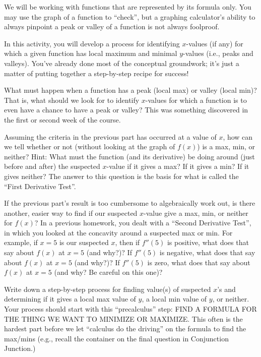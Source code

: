 \documentclass{ximera}
\begin{document}
We will be working with functions that are represented by its formula only.  You may use the graph of a function to ``check'', but a graphing calculator's ability to always pinpoint a peak or valley of a function is not always foolproof.

In this activity, you will develop a process for identifying $x$-values (if any) for which a given function has local maximum and minimal $y$-values (i.e., peaks and valleys).  You've already done most of the conceptual groundwork; it's just a matter of putting together a step-by-step recipe for success!

\begin{exploration} 
What must happen when a function  has a peak (local max) or valley (local min)?  That is, what should we look for to identify $x$-values for which a function is to even have a chance to have a peak or valley?  This was something discovered in the first or second week of the course.
\end{exploration}
\begin{exploration}
Assuming the criteria in the previous part has occurred at a value of $x$, how can we tell whether or not (without looking at the graph of  $f(x)$) is a max, min, or neither?  Hint:  What must the function (and its derivative) be doing around (just before and after) the suspected $x$-value if it gives a max?  If it gives a min?  If it gives neither?  The answer to this question is the basis for what is called the ``First Derivative Test''. 
\end{exploration}	
\begin{exploration} 
If the previous part's result is too cumbersome to algebraically work out, is there another, easier way to find if our suspected $x$-value give a max, min, or neither for $f(x)$?  In a previous homework, you dealt with a ``Second Derivative Test'', in which you looked at the concavity around a suspected max or min.  For example, if $x = 5$ is our suspected $x$, then if $f''(5)$ is positive, what does that say about $f(x)$ at $x = 5$ (and why?)?  If $f''(5)$ is negative, what does that say about $f(x)$ at $x = 5$ (and why?)?  If $f''(5)$ is zero, what does that say about $f(x)$ at $x = 5$ (and why? Be careful on this one)?  
\end{exploration}
\begin{exploration} 
Write down a step-by-step process for finding value(s) of suspected $x$'s and determining if it gives a local max value of $y$, a local min value of $y$, or neither.  Your process should start with this ``precalculus'' step:  FIND A FORMULA FOR THE THING WE WANT TO MINIMIZE OR MAXIMIZE.  This often is the hardest part before we let ``calculus do the driving'' on the formula to find the max/mins (e.g., recall the container on the final question in Conjunction Junction.)
\end{exploration}
\end{document}
